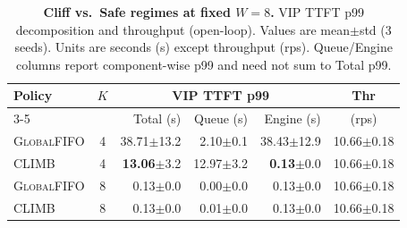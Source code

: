 \begin{table}[t]
  \centering
  \scriptsize
  \setlength{\tabcolsep}{2pt}
  \caption{\textbf{Cliff vs.\ Safe regimes at fixed $W{=}8$.}
  \textsf{VIP} TTFT p99 decomposition and throughput (open-loop).
  Values are mean$\pm$std (3 seeds). Units are seconds (s) except throughput (rps).
  Queue/Engine columns report component-wise p99 and need not sum to Total p99.}
  \label{tab:cliff_safe}
  \begin{tabular}{l c r r r c}
    \toprule
    \textbf{Policy} & \textbf{$K$} &
    \multicolumn{3}{c}{\textbf{\textsf{VIP} TTFT p99}} &
    \textbf{Thr} \\
    \cmidrule(lr){3-5}
     &  & Total (s) & Queue (s) & Engine (s) & (rps) \\
    \midrule

    \textsc{GlobalFIFO} & 4 & 38.71$\pm$13.2 & 2.10$\pm$0.1 & 38.43$\pm$12.9 & 10.66$\pm$0.18 \\
    \textsc{CLIMB}      & 4 & \textbf{13.06}$\pm$3.2 & 12.97$\pm$3.2 & \textbf{0.13}$\pm$0.0 & 10.66$\pm$0.18 \\
    \textsc{GlobalFIFO} & 8 & 0.13$\pm$0.0 & 0.00$\pm$0.0 & 0.13$\pm$0.0 & 10.66$\pm$0.18 \\
    \textsc{CLIMB}      & 8 & 0.13$\pm$0.0 & 0.01$\pm$0.0 & 0.13$\pm$0.0 & 10.66$\pm$0.18 \\
    \bottomrule
  \end{tabular}
\end{table}
